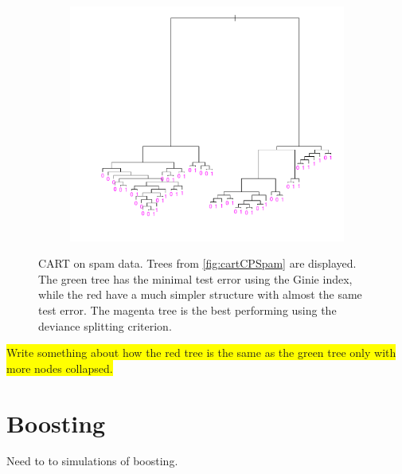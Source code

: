 \begin{figure}[h!tp]
  \begin{subfigure}[b]{0.48\textwidth}
    \includegraphics[width=\textwidth]{./figures/cartOptDevianceSpam.pdf}
  \end{subfigure}
  \vspace{1\baselineskip}
  \caption{CART on spam data. Trees from \ref{fig:cartCPSpam} are displayed. The green tree has the minimal test error using the Ginie index, while the red have a much simpler structure with almost the same test error. The magenta tree is the best performing using the deviance splitting criterion.}
  \label{fig:CartSpam}
\end{figure}
\colorbox{yellow}{Write something about how the red tree is the same as the green tree only with more nodes collapsed.}\\




\section{Boosting}
\label{sec:SimBoosting}
Need to to simulations of boosting.
